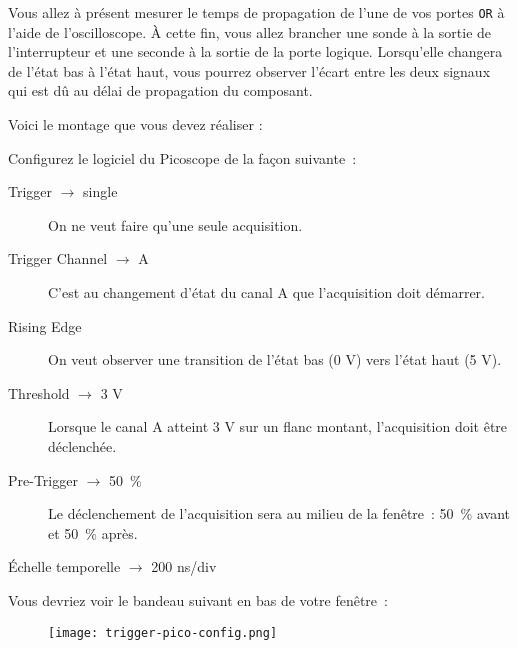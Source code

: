 \documentclass{../template/labo}
\begin{document}
\begin{manip}
Vous allez à présent mesurer le temps de propagation de l'une de vos portes \texttt{OR} à l'aide de l'oscilloscope.
À cette fin, vous allez brancher une sonde à la sortie de l'interrupteur et une seconde à la sortie de la porte logique.
Lorsqu'elle changera de l'état bas à l'état haut, vous pourrez observer l'écart entre les deux signaux qui est dû au délai de propagation du composant.

Voici le montage que vous devez réaliser :

Configurez le logiciel du Picoscope de la façon suivante~:
\begin{description}
	\item[Trigger $\rightarrow$ single] On ne veut faire qu'une seule acquisition.
	\item[Trigger Channel $\rightarrow$ A] C'est au changement d'état du canal A que l'acquisition doit démarrer.
	\item[Rising Edge] On veut observer une transition de l'état bas (0 V) vers l'état haut (5 V).
	\item[Threshold $\rightarrow$ 3 V] Lorsque le canal A atteint 3 V sur un flanc montant, l'acquisition doit être déclenchée.
	\item[Pre-Trigger $\rightarrow$ 50~\%] Le déclenchement de l'acquisition sera au milieu de la fenêtre~: 50~\% avant et 50~\% après.
	\item[Échelle temporelle $\rightarrow$ 200 ns/div] 
\end{description}

Vous devriez voir le bandeau suivant en bas de votre fenêtre~:
\begin{figure}[H]
	\texttt{[image: trigger-pico-config.png]}
\end{figure}



\end{manip}
\end{document}
